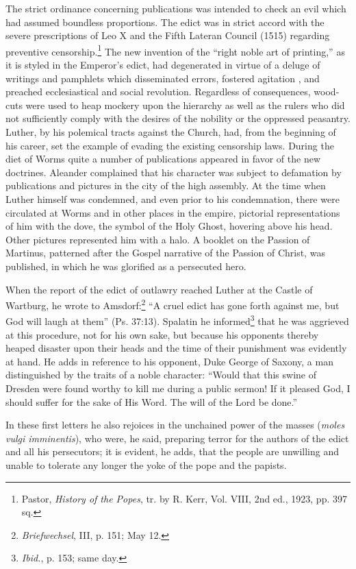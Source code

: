 The strict ordinance concerning publications was intended to
check an evil which had assumed boundless proportions. The edict
was in strict accord with the severe prescriptions of Leo X and the
Fifth Lateran Council (1515) regarding preventive censorship.\footnote
{Pastor, \textit{History of the Popes}, tr. by R. Kerr, Vol. VIII, 2nd ed., 1923, pp. 397 sq.}
The new invention of the “right noble art of printing,” as it is
styled in the Emperor’s edict, had degenerated in virtue of a deluge
of writings and pamphlets which disseminated errors, fostered agitation
, and preached ecclesiastical and social revolution. Regardless of
consequences, wood-cuts were used to heap mockery upon the hierarchy
as well as the rulers who did not sufficiently comply with the
desires of the nobility or the oppressed peasantry. Luther, by his
polemical tracts against the Church, had, from the beginning of his
career, set the example of evading the existing censorship laws.
During the diet of Worms quite a number of publications appeared
in favor of the new doctrines. Aleander complained that his character
was subject to defamation by publications and pictures in the
city of the high assembly. At the time when Luther himself was
condemned, and even prior to his condemnation, there were circulated
at Worms and in other places in the empire, pictorial representations of
him with the dove, the symbol of the Holy Ghost, hovering above his head.
Other pictures represented him with a halo. A
booklet on the Passion of Martinus, patterned after the Gospel narrative
of the Passion of Christ, was published, in which he was
glorified as a persecuted hero.

When the report of the edict of outlawry reached Luther at the
Castle of Wartburg, he wrote to Amsdorf:\footnote{\textit{Briefwechsel}, III, p. 151; May 12.}
“A cruel edict has
gone forth against me, but God will laugh at them” (Ps. 37:13).
Spalatin he informed\footnote{\textit{Ibid.}, p. 153; same day.}
that he was aggrieved at this procedure, not
for his own sake, but because his opponents thereby heaped disaster
upon their heads and the time of their punishment was evidently
at hand. He adds in reference to his opponent, Duke George of
Saxony, a man distinguished by the traits of a noble character:
“Would that this swine of Dresden were found worthy to kill me
during a public sermon! If it pleased God, I should suffer for the
sake of His Word. The will of the Lord be done.”

In these first letters he also rejoices in the unchained power of
the masses (\textit{moles vulgi imminentis}), who were, he said, preparing
terror for the authors of the edict and all his persecutors; it is evident,
he adds, that the people are unwilling and unable to tolerate any
longer the yoke of the pope and the papists.

